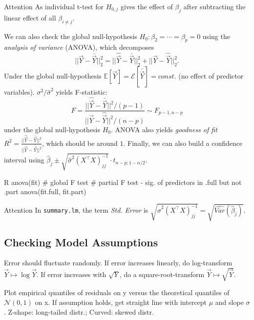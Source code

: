 \begin{attentionbox}{Attention}\nospacing{}
 As individual t-test for $H_{0,j}$ gives the effect of $\beta_{j}$ after subtracting the linear effect of all $\beta_{i\neq j}$.
\end{attentionbox}

 \begin{sectionbox}\nospacing{}
  We can also check the global null-hypothesis $H_{0}: \beta_{2} = \cdots = \beta_{p} = 0$ using the \emph{analysis of variance} (ANOVA), which decomposes
  \[||\vec{Y} - \bar{\vec{Y}}||^{2}_{2} = ||\hat{\vec{Y}} - \bar{\vec{Y}}||^{2}_{2} + ||\vec{Y} - \hat{\vec{Y}}||^{2}_{2}.\]
  Under the global null-hypothesis $\mathbb{E}[\vec{Y}] = \mathcal{E}[\bar{\vec{Y}}] = const$. (no effect of predictor variables). $\sigma^{2}/ \hat \sigma^{2}$ yields F-statistic:
  \[F = \frac{||\hat{\vec{Y}} - \bar{\vec{Y}}||^{2}/(p-1)}{||\vec{Y} - \hat{\vec{Y}}||^{2} / (n-p)} \sim F_{p-1,n-p}\] under the global null-hypothesis $H_{0}$.
  ANOVA also yields \emph{goodness of fit} $R^{2} = \frac{||\hat{\vec{Y}} - \bar{\vec{Y}}||^{2}}{||\vec{Y} - \bar{\vec{Y}}||^{2}}$, which should be around $1$.
  Finally, we can also build a confidence interval using $\hat \beta_{j} \pm \sqrt{\hat \sigma^{2}{{(X^{\top}X)}^{-1}_{jj}}} \cdot t_{n-p;1-\alpha/2}$.
   \begin{mintlinebox}{R}
  	anova(fit) # global F test
  	# partial F test - sig. of predictors in .full but not .part
  	anova(fit.full, fit.part)
  \end{mintlinebox}
  
  
 \end{sectionbox}

\begin{attentionbox}{Attention}\nospacing{}
 In \verb!summary.lm!, the term \emph{Std. Error} is $\sqrt{\hat \sigma^{2}{{(X^{\top}X)}^{-1}_{jj}}} = \sqrt{\hat{Var}(\hat \beta_{j})}$.
\end{attentionbox}


\subsection{Checking Model Assumptions}\label{subsec:checking_model_assumptions}
\begin{sectionbox}\nospacing{}
  Error should fluctuate randomly. If error increases linearly, do log-transform $\vec{Y} \mapsto \log{\vec{Y}}$. If error increases with $\sqrt{Y}$, do a square-root-transform $\vec{Y} \mapsto \sqrt{\vec{Y}}$.
\end{sectionbox}
\begin{sectionbox}\nospacing{}
  Plot empirical quantiles of residuals on y versus the theoretical quantiles of $\mathcal{N}(0,1)$ on x.
  If assumption holds, get straight line with intercept $\mu$ and slope $\sigma$.
  Z-shape: long-tailed distr.; Curved: skewed distr.
\end{sectionbox}

